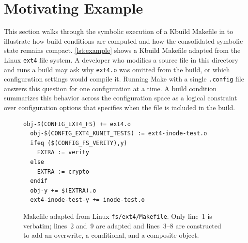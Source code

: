 \documentclass[acmsmall,screen,review,anonymous,nonacm]{acmart}
\begin{document}
\section{Motivating Example}
  \label{sec:example}
  This section walks through the symbolic execution of a Kbuild Makefile in \tool{} to illustrate how build conditions are computed and how the consolidated symbolic state remains compact.
  \autoref{lst:example} shows a Kbuild Makefile adapted from the Linux \texttt{ext4} file system.
  A developer who modifies a source file in this directory and runs a build may ask why \texttt{ext4.o} was omitted from the build, or which configuration settings would compile it.
  Running Make with a single \texttt{.config} file answers this question for one configuration at a time.
  A build condition summarizes this behavior across the configuration space as a logical constraint over configuration options that specifies when the file is included in the build.

  \begin{figure}[t]
  \begin{lstlisting}[style=kbuild]
  obj-$(CONFIG_EXT4_FS) += ext4.o
  obj-$(CONFIG_EXT4_KUNIT_TESTS) := ext4-inode-test.o
  ifeq ($(CONFIG_FS_VERITY),y)
    EXTRA := verity
  else
    EXTRA := crypto
  endif
  obj-y += $(EXTRA).o
  ext4-inode-test-y += inode-test.o
  \end{lstlisting}
  \caption{Makefile adapted from Linux \texttt{fs/ext4/Makefile}. Only line~1 is verbatim; lines~2 and~9 are adapted and lines~3--8 are constructed to add an overwrite, a conditional, and a composite object.}
  \label{lst:example}
  \end{figure}
\end{document}
